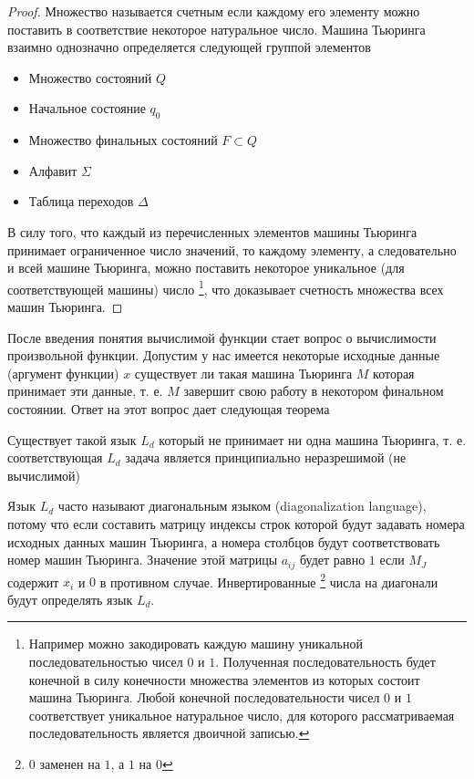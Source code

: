 \begin{proof}
Множество называется счетным \cite{bShenSet2012} если каждому его
элементу можно поставить 
в соответствие некоторое натуральное число. 
Машина Тьюринга взаимно однозначно определяется следующей группой элементов
\begin{itemize}
\item Множество состояний $Q$
\item Начальное состояние $q_0$
\item Множество финальных состояний $F \subset Q$
\item Алфавит $\Sigma$
\item Таблица переходов $\Delta$
\end{itemize}

В силу того, что каждый из перечисленных элементов машины Тьюринга
принимает ограниченное число значений, то каждому элементу, а
следовательно и всей машине Тьюринга, можно поставить некоторое
уникальное (для соответствующей машины) число
\footnote{
Например можно закодировать каждую машину уникальной
последовательностью чисел $0$ и $1$. Полученная последовательность
будет конечной в силу конечности множества элементов из которых
состоит машина Тьюринга. Любой конечной последовательности чисел $0$ и
$1$ соответствует уникальное натуральное число, для которого
рассматриваемая последовательность является двоичной записью. 
}, что доказывает счетность
множества всех машин Тьюринга.
\end{proof}

После введения понятия вычислимой функции стает вопрос о вычислимости
произвольной функции. Допустим у нас имеется некоторые исходные данные
(аргумент функции) $x$ существует ли такая машина Тьюринга $M$ которая
принимает эти данные, т. е. $M$ завершит свою работу в некотором
финальном состоянии. Ответ на этот вопрос дает следующая теорема

\begin{theorem}
Существует такой язык $L_d$ который не принимает ни одна машина
Тьюринга, т. е. соответствующая $L_d$ задача является принципиально
неразрешимой (не вычислимой) 
\label{theoremAddAlgoTuringLdUndecidability}
\end{theorem}

Язык $L_d$ часто называют диагональным языком (diagonalization
language), потому что если составить матрицу 
\cite{bUllman2006} индексы строк которой
будут задавать номера исходных данных машин Тьюринга, а номера
столбцов будут соответствовать номер машин Тьюринга. Значение этой
матрицы $a_{ij}$ будет равно $1$ если $M_J$ содержит $x_i$ и $0$ в
противном случае. Инвертированные \footnote{ $0$ заменен на $1$, а $1$
на $0$} числа на диагонали будут определять язык $L_d$.

